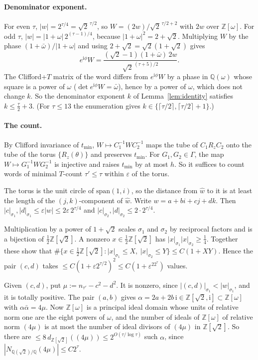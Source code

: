 \documentclass[aps,prx,twocolumn,superscriptaddress,nofootinbib,longbibliography]{revtex4-2}
\theoremstyle{plain}
\theoremstyle{definition}
\theoremstyle{remark}
\newcommand{\Z}{\mathbb{Z}}
\newcommand{\Q}{\mathbb{Q}}
\begin{document}
\paragraph{Denominator exponent.} For even $\tau$, $|w|=2^{\tau/4}=\sqrt2^{\,\tau/2}$, so $W=(2w)/\sqrt2^{\,\tau/2+2}$ with $2w$ over $\Z[\omega]$. For odd $\tau$, $|w|=|1+\omega|\,2^{(\tau-1)/4}$, because $|1+\omega|^2=2+\sqrt2$. Multiplying $W$ by the phase $(1+\bar\omega)/|1+\omega|$ and using $2+\sqrt2=\sqrt2(1+\sqrt2)$ gives
\[
e^{\mathrm i\phi}W=\frac{(\sqrt2-1)(1+\bar\omega)\,2w}{\sqrt2^{\,(\tau+5)/2}} .
\]
The Clifford+$T$ matrix of the word differs from $e^{\mathrm i\phi}W$ by a phase in $\Q(\omega)$ whose square is a power of $\omega$ ($\det e^{\mathrm i\phi}W=\bar\omega$), hence by a power of $\omega$, which does not change $k$. So the denominator exponent $k$ of Lemma~\ref{lem:identity} satisfies $k\le\tfrac\tau2+3$. (For $\tau\le13$ the enumeration gives $k\in\{\lceil\tau/2\rceil,\lceil\tau/2\rceil+1\}$.)

\paragraph{The count.} By Clifford invariance of $t_{\min}$, $W\mapsto C_1^{-1}WC_2^{-1}$ maps the tube of $C_1R_zC_2$ onto the tube of the torus $\{R_z(\theta)\}$ and preserves $t_{\min}$. For $G_1,G_2\in\Gamma$, the map $W\mapsto G_1^{-1}WG_2^{-1}$ is injective and raises $t_{\min}$ by at most $h$. So it suffices to count words of minimal $T$-count $\tau'\le\tau$ within $\varepsilon$ of the torus.

The torus is the unit circle of $\mathrm{span}(1,i)$, so the distance from $\hat w$ to it is at least the length of the $(j,k)$-component of $\hat w$. Write $w=a+bi+cj+dk$. Then $|c|_{\sigma_1},|d|_{\sigma_1}\le\varepsilon|w|\le2\varepsilon\,2^{\tau/4}$ and $|c|_{\sigma_2},|d|_{\sigma_2}\le2\cdot2^{\tau/4}$.

Multiplication by a power of $1+\sqrt2$ scales $\sigma_1$ and $\sigma_2$ by reciprocal factors and is a bijection of $\tfrac12\Z[\sqrt2]$. A nonzero $x\in\tfrac12\Z[\sqrt2]$ has $|x|_{\sigma_1}|x|_{\sigma_2}\ge\tfrac14$. Together these show that $\#\{x\in\tfrac12\Z[\sqrt2]:|x|_{\sigma_1}\le X,\ |x|_{\sigma_2}\le Y\}\le C(1+XY)$. Hence the pair $(c,d)$ takes $\le C(1+\varepsilon2^{\tau/2})^2\le C(1+\varepsilon^22^\tau)$ values.

Given $(c,d)$, put $\mu:=n_{\tau'}-c^2-d^2$. It is nonzero, since $|(c,d)|_{\sigma_1}<|w|_{\sigma_1}$, and it is totally positive. The pair $(a,b)$ gives $\alpha=2a+2b\,\mathrm i\in\Z[\sqrt2,\mathrm i]\subset\Z[\omega]$ with $\alpha\bar\alpha=4\mu$. Now $\Z[\omega]$ is a principal ideal domain whose units of relative norm one are the eight powers of $\omega$, and the number of ideals of $\Z[\omega]$ of relative norm $(4\mu)$ is at most the number of ideal divisors of $(4\mu)$ in $\Z[\sqrt2]$. So there are $\le8\,d_{\Z[\sqrt2]}((4\mu))\le2^{O(\tau/\log\tau)}$ such $\alpha$, since $|N_{\Q(\sqrt2)/\Q}(4\mu)|\le C2^{\tau}$.
\end{document}
